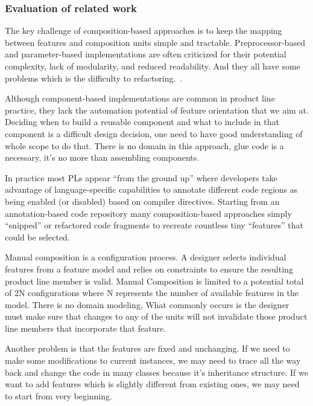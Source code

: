 \subsubsection{Evaluation of related work}

The key challenge of composition-based approaches is to keep the mapping
between features and composition units simple and tractable.
Preprocessor-based and parameter-based implementations are often
criticized for their potential complexity, lack of modularity, and
reduced readability. And they all have some problems which is the
difficulty to refactoring.~\cite{Kim:2017:RJS:3106195.3106201}.

Although component-based implementations are common in product line
practice, they lack the automation potential of feature orientation that
we aim at. Deciding when to build a reusable component and what to
include in that component is a difficult design decision, one need to
have good understanding of whole scope to do that. There is no domain in
this approach, glue code is a necessary, it's no more than assembling
components. ~\cite{Apel:2013:FSP:2541773}

In practice most PLs appear “from the ground up” where developers take
advantage of language-specific capabilities to annotate different code
regions as being enabled (or disabled) based on compiler directives.
Starting from an annotation-based code repository many composition-based
approaches simply “snipped” or refactored code fragments to recreate
countless tiny “features” that could be selected.

Manual composition is a configuration process. A designer selects
individual features from a feature model and relies on constraints to
ensure the resulting product line member is valid. Manual Composition is
limited to a potential total of 2N configurations where N represents the
number of available features in the model. There is no domain modeling,
What commonly occurs is the designer must make sure that changes to any
of the units will not invalidate those product line members that
incorporate that feature.

Another problem is that the features are fixed and unchanging. If we
need to make some modifications to current instances, we may need to
trace all the way back and change the code in many classes because it’s
inheritance structure. If we want to add features which is slightly
different from existing ones, we may need to start from very beginning.
